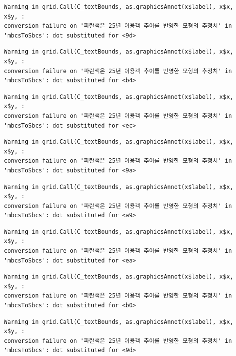 \documentclass[
  letterpaper,
  DIV=11,
  numbers=noendperiod]{scrreprt}
\begin{document}
\begin{verbatim}
Warning in grid.Call(C_textBounds, as.graphicsAnnot(x$label), x$x, x$y, :
conversion failure on '파란색은 25년 이용객 추이를 반영한 모형의 추정치' in
'mbcsToSbcs': dot substituted for <9d>
\end{verbatim}

\begin{verbatim}
Warning in grid.Call(C_textBounds, as.graphicsAnnot(x$label), x$x, x$y, :
conversion failure on '파란색은 25년 이용객 추이를 반영한 모형의 추정치' in
'mbcsToSbcs': dot substituted for <b4>
\end{verbatim}

\begin{verbatim}
Warning in grid.Call(C_textBounds, as.graphicsAnnot(x$label), x$x, x$y, :
conversion failure on '파란색은 25년 이용객 추이를 반영한 모형의 추정치' in
'mbcsToSbcs': dot substituted for <ec>
\end{verbatim}

\begin{verbatim}
Warning in grid.Call(C_textBounds, as.graphicsAnnot(x$label), x$x, x$y, :
conversion failure on '파란색은 25년 이용객 추이를 반영한 모형의 추정치' in
'mbcsToSbcs': dot substituted for <9a>
\end{verbatim}

\begin{verbatim}
Warning in grid.Call(C_textBounds, as.graphicsAnnot(x$label), x$x, x$y, :
conversion failure on '파란색은 25년 이용객 추이를 반영한 모형의 추정치' in
'mbcsToSbcs': dot substituted for <a9>
\end{verbatim}

\begin{verbatim}
Warning in grid.Call(C_textBounds, as.graphicsAnnot(x$label), x$x, x$y, :
conversion failure on '파란색은 25년 이용객 추이를 반영한 모형의 추정치' in
'mbcsToSbcs': dot substituted for <ea>
\end{verbatim}

\begin{verbatim}
Warning in grid.Call(C_textBounds, as.graphicsAnnot(x$label), x$x, x$y, :
conversion failure on '파란색은 25년 이용객 추이를 반영한 모형의 추정치' in
'mbcsToSbcs': dot substituted for <b0>
\end{verbatim}

\begin{verbatim}
Warning in grid.Call(C_textBounds, as.graphicsAnnot(x$label), x$x, x$y, :
conversion failure on '파란색은 25년 이용객 추이를 반영한 모형의 추정치' in
'mbcsToSbcs': dot substituted for <9d>
\end{verbatim}
\end{document}
